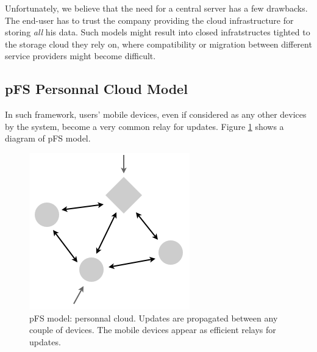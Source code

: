 Unfortunately, we believe that the need for a central server has a few
drawbacks. The end-user has to trust the company providing the cloud
infrastructure for storing \emph{all} his data. Such models might
result into closed infratstructes tighted to the storage cloud
they rely on, where compatibility or migration between different
service providers might become difficult.

\subsection {pFS Personnal Cloud Model}

In such
framework, users' mobile devices, even if considered as any other
devices by the system, become a very common relay for updates. Figure
\ref{PfsModel} shows a diagram of pFS model.

\begin{figure}[ht]
\begin{center}
  \includegraphics [scale=0.4] {img/pfs_model}
  \caption{\label{PfsModel} {\small pFS model: personnal
      cloud. Updates are propagated between any couple of
      devices. The mobile devices appear as efficient relays 
      for updates.}}
\end{center}
\end{figure}






